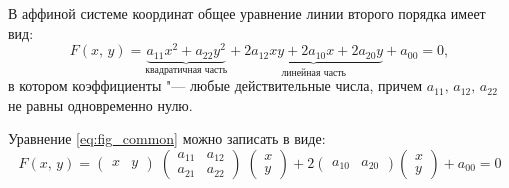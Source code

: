 \begin{definition}
  В аффиной системе координат общее уравнение линии второго порядка имеет вид:  
  \begin{equation}
    \label{eq:fig_common}
    F(x,\, y) = \underbrace{a_{11}x^2 + a_{22}y^2}_{\text{квадратичная часть}} + 
  \underbrace{2a_{12}xy + 2a_{10}x + 2a_{20}y}_{\text{линейная часть}} + a_{00} = 0,
  \end{equation}
  в котором коэффициенты "--- любые действительные числа, причем $a_{11},\, a_{12}, \, a_{22}$ не равны одновременно нулю.
\end{definition}

Уравнение \ref{eq:fig_common} можно записать в виде:
$$
  F(x, \, y) = \begin{pmatrix} x & y \end{pmatrix} \; \begin{pmatrix}
    a_{11} & a_{12} \\
    a_{21} & a_{22}
  \end{pmatrix} \; \begin{pmatrix} x \\ y \end{pmatrix} + 2 \begin{pmatrix} a_{10} & a_{20} \end{pmatrix} \begin{pmatrix} x \\ y \end{pmatrix} + a_{00} = 0
$$

